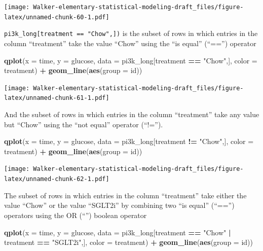 \documentclass[]{book}
\newenvironment{Shaded}{\begin{snugshade}}{\end{snugshade}}
\newcommand{\DataTypeTok}[1]{\textcolor[rgb]{0.13,0.29,0.53}{#1}}
\newcommand{\KeywordTok}[1]{\textcolor[rgb]{0.13,0.29,0.53}{\textbf{#1}}}
\newcommand{\NormalTok}[1]{#1}
\newcommand{\OperatorTok}[1]{\textcolor[rgb]{0.81,0.36,0.00}{\textbf{#1}}}
\newcommand{\StringTok}[1]{\textcolor[rgb]{0.31,0.60,0.02}{#1}}
\begin{document}
\texttt{[image: Walker-elementary-statistical-modeling-draft\_files/figure-latex/unnamed-chunk-60-1.pdf]}

\texttt{pi3k\_long{[}treatment\ ==\ "Chow",{]})} is the subset of rows in which entries in the column ``treatment'' take the value ``Chow'' using the ``is equal'' (``=='') operator

\begin{Shaded}
\begin{Highlighting}[]
\KeywordTok{qplot}\NormalTok{(}\DataTypeTok{x =}\NormalTok{ time,}
      \DataTypeTok{y =}\NormalTok{ glucose,}
      \DataTypeTok{data =}\NormalTok{ pi3k_long[treatment }\OperatorTok{==}\StringTok{ "Chow"}\NormalTok{,],}
      \DataTypeTok{color =}\NormalTok{ treatment) }\OperatorTok{+}
\StringTok{  }\KeywordTok{geom_line}\NormalTok{(}\KeywordTok{aes}\NormalTok{(}\DataTypeTok{group =}\NormalTok{ id))}
\end{Highlighting}
\end{Shaded}

\texttt{[image: Walker-elementary-statistical-modeling-draft\_files/figure-latex/unnamed-chunk-61-1.pdf]}

And the subset of rows in which entries in the column ``treatment'' take any value but ``Chow'' using the ``not equal'' operator (``!='').

\begin{Shaded}
\begin{Highlighting}[]
\KeywordTok{qplot}\NormalTok{(}\DataTypeTok{x =}\NormalTok{ time,}
      \DataTypeTok{y =}\NormalTok{ glucose,}
      \DataTypeTok{data =}\NormalTok{ pi3k_long[treatment }\OperatorTok{!=}\StringTok{ "Chow"}\NormalTok{,],}
      \DataTypeTok{color =}\NormalTok{ treatment) }\OperatorTok{+}
\StringTok{  }\KeywordTok{geom_line}\NormalTok{(}\KeywordTok{aes}\NormalTok{(}\DataTypeTok{group =}\NormalTok{ id))}
\end{Highlighting}
\end{Shaded}

\texttt{[image: Walker-elementary-statistical-modeling-draft\_files/figure-latex/unnamed-chunk-62-1.pdf]}

The subset of rows in which entries in the column ``treatment'' take either the value ``Chow'' or the value ``SGLT2i'' by combining two ``is equal'' (``=='') operators using the OR (``\textbar{}'') boolean operator

\begin{Shaded}
\begin{Highlighting}[]
\KeywordTok{qplot}\NormalTok{(}\DataTypeTok{x =}\NormalTok{ time,}
      \DataTypeTok{y =}\NormalTok{ glucose,}
      \DataTypeTok{data =}\NormalTok{ pi3k_long[treatment }\OperatorTok{==}\StringTok{ "Chow"} \OperatorTok{|}\StringTok{ }\NormalTok{treatment }\OperatorTok{==}\StringTok{ "SGLT2i"}\NormalTok{,],}
      \DataTypeTok{color =}\NormalTok{ treatment) }\OperatorTok{+}
\StringTok{  }\KeywordTok{geom_line}\NormalTok{(}\KeywordTok{aes}\NormalTok{(}\DataTypeTok{group =}\NormalTok{ id))}
\end{Highlighting}
\end{Shaded}
\end{document}
